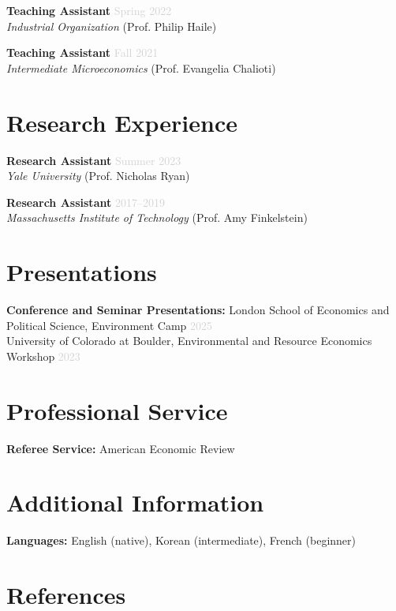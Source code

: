 \documentclass[11pt,letterpaper]{article}
\newcommand{\jobtitle}[1]{\textbf{\color{mediumgray}#1}}
\newcommand{\institution}[1]{\textit{#1}}
\newcommand{\daterange}[1]{\textcolor{lightgray}{#1}}
\begin{document}
\jobtitle{Teaching Assistant} \hfill \daterange{Spring 2022} \\
\institution{Industrial Organization} (Prof. Philip Haile)

\jobtitle{Teaching Assistant} \hfill \daterange{Fall 2021} \\
\institution{Intermediate Microeconomics} (Prof. Evangelia Chalioti)

\section*{Research Experience}

\jobtitle{Research Assistant} \hfill \daterange{Summer 2023} \\
\institution{Yale University} (Prof. Nicholas Ryan)

\jobtitle{Research Assistant} \hfill \daterange{2017--2019} \\
\institution{Massachusetts Institute of Technology} (Prof. Amy Finkelstein)

\section*{Presentations}

\textbf{Conference and Seminar Presentations:}
London School of Economics and Political Science, Environment Camp \hfill \daterange{2025} \\
University of Colorado at Boulder, Environmental and Resource Economics Workshop \hfill \daterange{2023}

\section*{Professional Service}

\textbf{Referee Service:} American Economic Review

\section*{Additional Information}

\textbf{Languages:} English (native), Korean (intermediate), French (beginner)


\section*{References}
\end{document}
